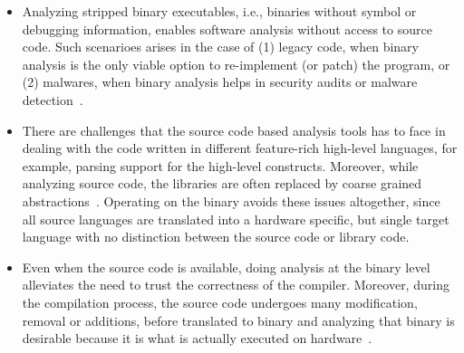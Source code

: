 \begin{itemize}
    
    \item Analyzing stripped binary executables, i.e., binaries without symbol
    or debugging information, enables software analysis without access to
    source code. Such scenarioes arises in the case of (1) legacy code, when
    binary analysis is the only viable option to re-implement (or patch) the
    program, or (2) malwares, when binary analysis helps in security audits or
    malware
    detection~\cite{Christodorescu:2005,Andreas2007,Kinder:2005,Kinder:2010,Kolbitsch:2009}.
    
    \item There are challenges that the source code based analysis tools has to
    face  in dealing with the code written in different feature-rich high-level
    languages, for example, parsing support for  the high-level constructs.
    Moreover, while analyzing source code, the libraries are often replaced by
    coarse grained abstractions~\cite{libabs}. Operating on the binary avoids
    these issues altogether, since all source languages are translated into a
    hardware specific, but single target language with no distinction between
    the source code or library code. 
    
    \item Even when the source code is available, doing analysis at the binary
    level alleviates the need to trust the correctness of the compiler.
    Moreover, during the compilation process, the source code undergoes many
    modification, removal or additions, before translated to binary and
    analyzing that binary is desirable because it is what is actually executed on
    hardware~\cite{WYSINWYE}. 
    
\end{itemize}

